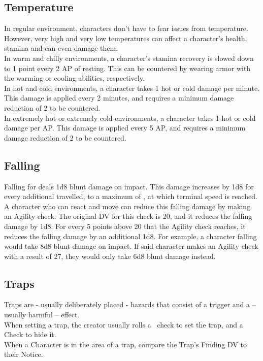 \subsection{Temperature}\label{subsec:temperature}
In regular environment, characters don't have to fear issues from temperature.
However, very high and very low temperatures can affect a character's health, stamina and can even damage them.\\

In warm and chilly environments, a character's stamina recovery is slowed down to 1 point every 2 AP of resting.
This can be countered by wearing armor with the warming or cooling abilities, respectively.\\

In hot and cold environments, a character takes 1 hot or cold damage per minute.
This damage is applied every 2 minutes, and requires a minimum damage reduction of 2 to be countered.\\

In extremely hot or extremely cold environments, a character takes 1 hot or cold damage per AP.
This damage is applied every 5 AP, and requires a minimum damage reduction of 2 to be countered.\\

\subsection{Falling}\label{subsec:falling}
Falling for  deals 1d8 blunt damage on impact.
This damage increases by 1d8 for every additional  travelled, to a maximum of , at which terminal speed is reached.
A character who can react and move can reduce this falling damage by making an Agility check.
The original DV for this check is 20, and it reduces the falling damage by 1d8.
For every 5 points above 20 that the Agility check reaches, it reduces the falling damage by an additional 1d8.
For example, a character falling  would take 8d8 blunt damage on impact.
If said character makes an Agility check with a result of 27, they would only take 6d8 blunt damage instead.

\subsection{Traps}\label{subsec:traps}
Traps are - usually deliberately placed - hazards that consist of a trigger and a -- usually harmful -- effect.\\
When setting a trap, the creator usually rolls a~ check to set the trap, and a~ Check to hide it.\\
When a Character is in the area of a trap, compare the Trap's Finding DV to their Notice.

